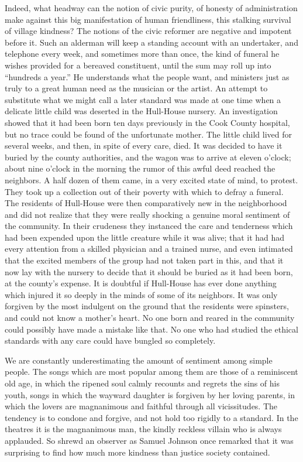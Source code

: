 \documentclass[]{article}
\begin{document}
\begin{sectionbody}
\addamsparagraph Indeed, what headway can the notion of civic purity, of honesty of
administration make against this big manifestation of human
friendliness, this stalking survival of village kindness? The notions of
the civic reformer are negative and impotent before it. Such an alderman
will keep a standing account with an undertaker, and telephone every
week, and sometimes more than once, the kind of funeral he wishes
provided for a bereaved constituent, until the sum may roll up into
``hundreds a year.'' He understands what the people want, and ministers
just as truly to a great human need as the musician or the artist. An
attempt to substitute what we might call a later standard was made at
one time when a delicate little child was deserted in the Hull-House
nursery. An investigation showed that it had been born ten days
previously in the Cook County hospital, but no trace could be found of
the unfortunate mother. The little child lived for several weeks, and
then, in spite of every care, died. It was decided to have it buried by
the county authorities, and the wagon was to arrive at eleven o'clock;
about nine o'clock in the morning the rumor of this awful deed reached
the neighbors. A half dozen of them came, in a very excited state of
mind, to protest. They took up a collection out of their poverty with
which to defray a funeral. The residents of Hull-House were then
comparatively new in the neighborhood and did not realize that they were
really shocking a genuine moral sentiment of the community. In their
crudeness they instanced the care and tenderness which had been expended
upon the little creature while it was alive; that it had had every
attention from a skilled physician and a trained nurse, and even
intimated that the excited members of the group had not taken part in
this, and that it now lay with the nursery to decide that it should be
buried as it had been born, at the county's expense. It is doubtful if
Hull-House has ever done anything which injured it so deeply in the
minds of some of its neighbors. It was only forgiven by the most
indulgent on the ground that the residents were spinsters, and could not
know a mother's heart. No one born and reared in the community could
possibly have made a mistake like that. No one who had studied the
ethical standards with any care could have bungled so completely.

\addamsparagraph We are constantly underestimating the amount of sentiment among simple
people. The songs which are most popular among them are those of a
reminiscent old age, in which the ripened soul calmly recounts and
regrets the sins of his youth, songs in which the wayward daughter is
forgiven by her loving parents, in which the lovers are magnanimous and
faithful through all vicissitudes. The tendency is to condone and
forgive, and not hold too rigidly to a standard. In the theatres it is
the magnanimous man, the kindly reckless villain who is always
applauded. So shrewd an observer as Samuel Johnson once remarked that it
was surprising to find how much more kindness than justice society
contained.


\end{sectionbody}
\end{document}
